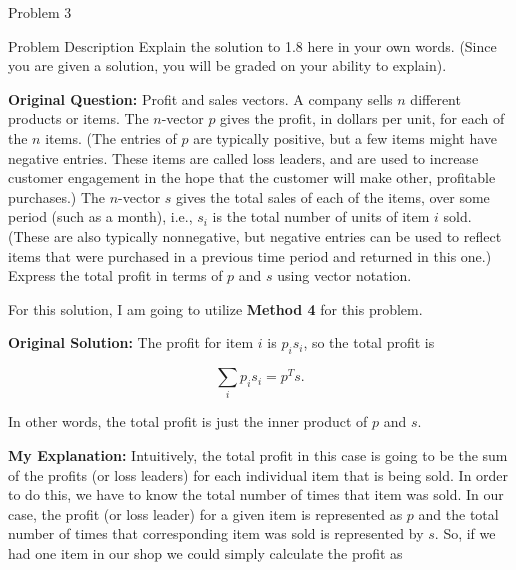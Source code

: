 \begin{problem}{Problem 3}
    \begin{statement}{Problem Description}
        Explain the solution to 1.8 here in your own words. (Since you are given a solution, you will be graded on your ability to explain). \vspace*{1em}

        \textbf{Original Question:} Profit and sales vectors. A company sells $n$ different products or items. The $n$-vector $p$ gives the profit, in dollars per unit, for each of the $n$ items. (The entries 
        of $p$ are typically positive, but a few items might have negative entries. These items are called loss leaders, and are used to increase customer engagement in the hope that the customer will make other, 
        profitable purchases.) The $n$-vector $s$ gives the total sales of each of the items, over some period (such as a month), i.e., $s_{i}$ is the total number of units of item $i$ sold. (These are also typically 
        nonnegative, but negative entries can be used to reflect items that were purchased in a previous time period and returned in this one.) Express the total profit in terms of $p$ and $s$ using vector notation.
    \end{statement}

    \begin{Highlight}[Solution]
        For this solution, I am going to utilize \textbf{Method 4} for this problem. \vspace*{1em}

        \textbf{Original Solution:} The profit for item $i$ is $p_{i}s_{i}$, so the total profit is

        \setcounter{equation}{0}
        \begin{equation}
            \sum_{i} p_{i}s_{i} = p^{T}s.
        \end{equation}

        In other words, the total profit is just the inner product of $p$ and $s$. \vspace*{1em}

        \textbf{My Explanation:} Intuitively, the total profit in this case is going to be the sum of the profits (or loss leaders) for each individual item that is being sold. In order to do this, we have to know 
        the total number of times that item was sold. In our case, the profit (or loss leader) for a given item is represented as $p$ and the total number of times that corresponding item was sold is represented by
        $s$. So, if we had one item in our shop we could simply calculate the profit as


\end{Highlight}
\end{problem}
